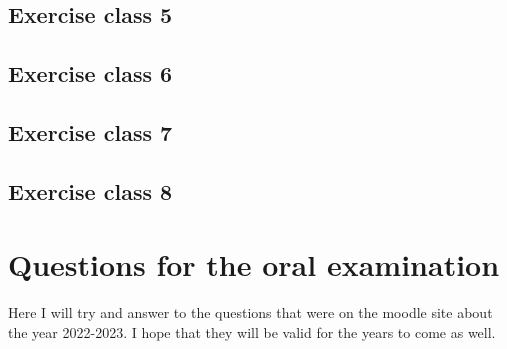\documentclass{report}
\begin{document}
\subsection{Exercise class 5}
\subsection{Exercise class 6}
\subsection{Exercise class 7}
\subsection{Exercise class 8}
\section{Questions for the oral examination}
Here I will try and answer to the questions that were on the moodle site about the year 2022-2023. I hope that they will be valid for the years to come as well.
\end{document}
